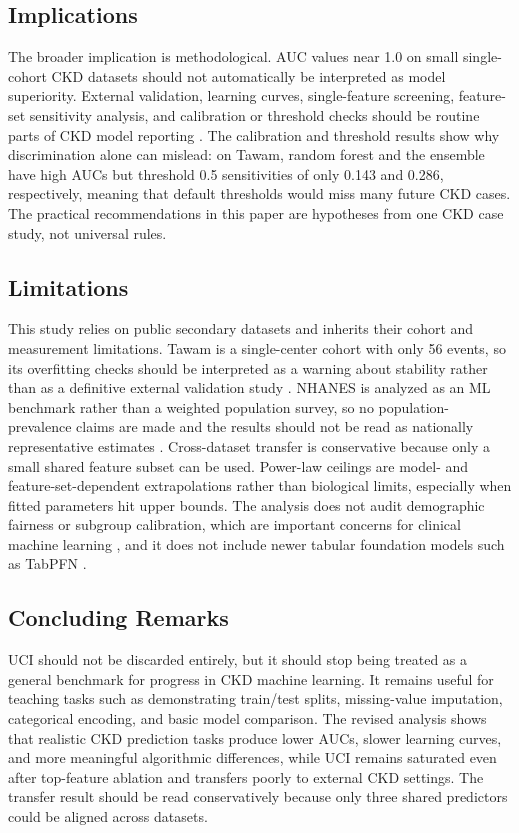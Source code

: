 \documentclass[12pt]{article}
\begin{document}
\subsection{Implications}
The broader implication is methodological. AUC values near 1.0 on small single-cohort CKD datasets should not automatically be interpreted as model superiority. External validation, learning curves, single-feature screening, feature-set sensitivity analysis, and calibration or threshold checks should be routine parts of CKD model reporting \cite{vabalas2019,collins2024,ongly2024,hill2024}. The calibration and threshold results show why discrimination alone can mislead: on Tawam, random forest and the ensemble have high AUCs but threshold 0.5 sensitivities of only 0.143 and 0.286, respectively, meaning that default thresholds would miss many future CKD cases. The practical recommendations in this paper are hypotheses from one CKD case study, not universal rules.

\subsection{Limitations}
This study relies on public secondary datasets and inherits their cohort and measurement limitations. Tawam is a single-center cohort with only 56 events, so its overfitting checks should be interpreted as a warning about stability rather than as a definitive external validation study \cite{alshamsi2018,vabalas2019}. NHANES is analyzed as an ML benchmark rather than a weighted population survey, so no population-prevalence claims are made and the results should not be read as nationally representative estimates \cite{nhanes2024brief}. Cross-dataset transfer is conservative because only a small shared feature subset can be used. Power-law ceilings are model- and feature-set-dependent extrapolations rather than biological limits, especially when fitted parameters hit upper bounds. The analysis does not audit demographic fairness or subgroup calibration, which are important concerns for clinical machine learning \cite{yang2023}, and it does not include newer tabular foundation models such as TabPFN \cite{hollmann2025}.

\subsection{Concluding Remarks}
UCI should not be discarded entirely, but it should stop being treated as a general benchmark for progress in CKD machine learning. It remains useful for teaching tasks such as demonstrating train/test splits, missing-value imputation, categorical encoding, and basic model comparison. The revised analysis shows that realistic CKD prediction tasks produce lower AUCs, slower learning curves, and more meaningful algorithmic differences, while UCI remains saturated even after top-feature ablation and transfers poorly to external CKD settings. The transfer result should be read conservatively because only three shared predictors could be aligned across datasets.
\end{document}
